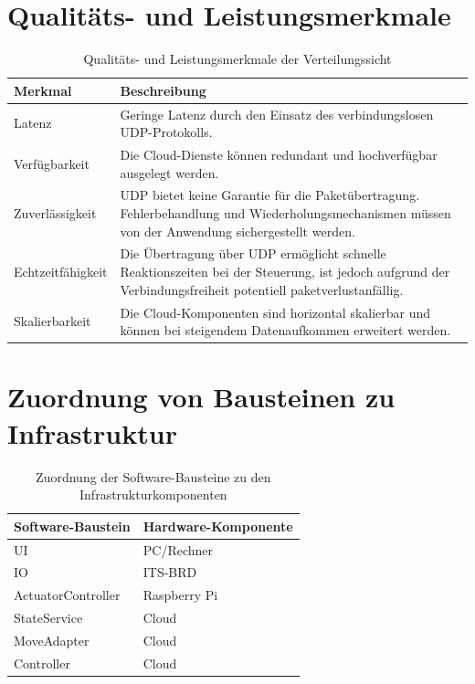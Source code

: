 \section{Qualitäts- und Leistungsmerkmale}

\begin{table}[h!]
\centering
\begin{tabular}{|l|p{10cm}|}
\hline
\textbf{Merkmal} & \textbf{Beschreibung} \\ \hline
Latenz & Geringe Latenz durch den Einsatz des verbindungslosen UDP-Protokolls. \\ \hline
Verfügbarkeit & Die Cloud-Dienste können redundant und hochverfügbar ausgelegt werden. \\ \hline
Zuverlässigkeit & UDP bietet keine Garantie für die Paketübertragung. Fehlerbehandlung und Wiederholungsmechanismen müssen von der Anwendung sichergestellt werden. \\ \hline
Echtzeitfähigkeit & Die Übertragung über UDP ermöglicht schnelle Reaktionszeiten bei der Steuerung, ist jedoch aufgrund der Verbindungsfreiheit potentiell paketverlustanfällig. \\ \hline
Skalierbarkeit & Die Cloud-Komponenten sind horizontal skalierbar und können bei steigendem Datenaufkommen erweitert werden. \\ \hline
\end{tabular}
\caption{Qualitäts- und Leistungsmerkmale der Verteilungssicht}
\end{table}

\section{Zuordnung von Bausteinen zu Infrastruktur}

\begin{table}[h!]
\centering
\begin{tabular}{|l|l|}
\hline
\textbf{Software-Baustein} & \textbf{Hardware-Komponente} \\ \hline
UI & PC/Rechner \\ \hline
IO & ITS-BRD \\ \hline
ActuatorController & Raspberry Pi \\ \hline
StateService & Cloud \\ \hline
MoveAdapter & Cloud \\ \hline
Controller & Cloud \\ \hline
\end{tabular}
\caption{Zuordnung der Software-Bausteine zu den Infrastrukturkomponenten}
\end{table}

